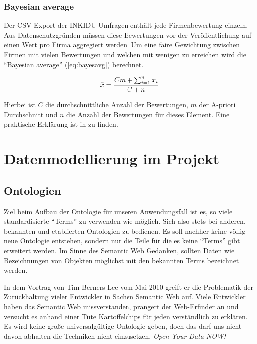 \subsubsection{Bayesian average}
Der CSV Export der INKIDU Umfragen enthält jede Firmenbewertung einzeln.
Aus Datenschutzgründen müssen diese Bewertungen vor der Veröffentlichung auf einen Wert pro Firma aggregiert werden.
Um eine faire Gewichtung zwischen Firmen mit vielen Bewertungen und welchen mit wenigen zu erreichen wird die ``Bayesian average'' (\ref{eq:bayesavg}) berechnet.

\begin{equation}
\bar{x} = {Cm + \sum_{i=1}^n{x_i} \over C + n} 	\label{eq:bayesavg}
\end{equation}

Hierbei ist $C$ die durchschnittliche Anzahl der Bewertungen, $m$ der A-priori Durchschnitt und $n$ die Anzahl der Bewertungen für dieses Element.
Eine praktische Erklärung ist in \cite{Weichs06} zu finden.


\section{Datenmodellierung im Projekt} 	%
\label{sec-idee-datenmodel}
\subsection{Ontologien}
Ziel beim Aufbau der Ontologie für unseren Anwendungsfall ist es, so viele standardisierte ``Terms'' zu verwenden wie möglich. Sich also stets bei anderen, bekannten und etablierten Ontologien zu bedienen.
Es soll nachher keine völlig neue Ontologie entstehen, sondern nur die Teile für die es keine ``Terms'' gibt erweitert werden. Im Sinne des Semantic Web Gedanken, sollten Daten wie Bezeichnungen von Objekten möglichst mit den bekannten Terms bezeichnet werden. 

In dem Vortrag von Tim Berners Lee vom Mai 2010  \cite{W3CQALD} greift er die Problematik der Zurückhaltung vieler Entwickler in Sachen Semantic Web auf. Viele Entwickler haben das Semantic Web missverstanden, prangert der Web-Erfinder an und versucht es anhand einer Tüte Kartoffelchips für jeden verständlich zu erklären. Es wird keine große universalgültige Ontologie geben, doch das darf uns nicht davon abhalten die Techniken nicht einzusetzen. \textit{Open Your Data NOW!}

